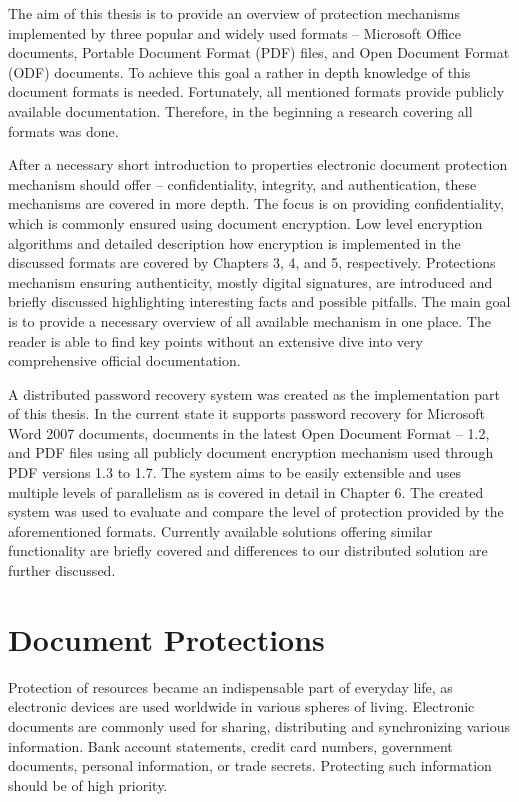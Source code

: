 \documentclass[11pt,oneside]{fithesis2}
\begin{document}
The aim of this thesis is to provide an overview of protection mechanisms implemented by three popular and widely used formats -- Microsoft Office documents, Portable Document Format (PDF) files, and Open Document Format (ODF) documents. To achieve this goal a rather in depth knowledge of this document formats is needed. Fortunately, all mentioned formats provide publicly available documentation. Therefore, in the beginning a research covering all formats was done. 

After a necessary short introduction to properties electronic document protection mechanism should offer -- confidentiality, integrity, and authentication, these mechanisms are covered in more depth. The focus is on providing confidentiality, which is commonly ensured using document encryption. Low level encryption algorithms and detailed description how encryption is implemented in the discussed formats are covered by Chapters 3, 4, and 5, respectively. Protections mechanism ensuring authenticity, mostly digital signatures, are introduced and briefly discussed highlighting interesting facts and possible pitfalls. The main goal is to provide a necessary overview of all available mechanism in one place. The reader is able to find key points without an extensive dive into very comprehensive official documentation. 

A distributed password recovery system was created as the implementation part of this thesis. In the current state it supports password recovery for Microsoft Word 2007 documents, documents in the latest Open Document Format -- 1.2, and PDF files using all publicly document encryption mechanism used through PDF versions 1.3 to 1.7. The system aims to be easily extensible and uses multiple levels of  parallelism as is covered in detail in Chapter 6. The created system was used to evaluate and compare the level of protection provided by the aforementioned formats. Currently available solutions offering similar functionality are briefly covered and differences to our distributed solution are further discussed.
 
\chapter{Document Protections}

Protection of resources became an indispensable part of everyday life, as electronic devices are used worldwide in various spheres of living. Electronic documents are commonly used for sharing, distributing and synchronizing various information. Bank account statements, credit card numbers, government documents, personal information, or trade secrets. Protecting such information should be of high priority.
\end{document}
